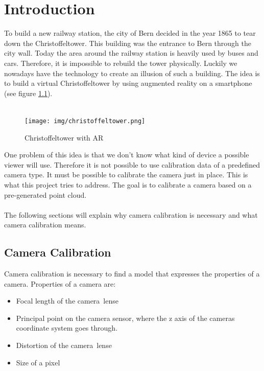 \documentclass[11pt,a4paper,titlepage,oneside]{report}
\begin{document}
\chapter{Introduction}
To build a new railway station, the city of Bern decided in the year 1865 to tear down the Christoffeltower. This building was the entrance to Bern through the city wall. Today the area around the railway station is heavily used by buses and cars. Therefore, it is impossible to rebuild the tower physically. Luckily we nowadays have the technology to create an illusion of such a building. The idea is to build a virtual Christoffeltower by using augmented reality on a smartphone (see figure \ref{fig:christoffeltower}).\\\\
\begin{figure}[H]
  \begin{center}
		\texttt{[image: img/christoffeltower.png]}
  \end{center}
	\caption{Christoffeltower with AR}\label{fig:christoffeltower}
\end{figure}
One problem of this idea is that we don't know what kind of device a possible viewer will use. Therefore it is not possible to use calibration data of a predefined camera type. It must be possible to calibrate the camera just in place. This is what this project tries to address. The goal is to calibrate a camera based on a pre-generated point cloud.\\\\
The following sections will explain why camera calibration is necessary and what camera calibration means.

\section{Camera Calibration}\label{sec:calibration}
Camera calibration is necessary to find a model that expresses the properties of a camera. Properties of a camera are:

\begin{itemize}
	\item Focal length of the camera lense
	\item Principal point on the camera sensor, where the z axis of the cameras coordinate system goes through.
	\item Distortion of the camera lense
	\item Size of a pixel
\end{itemize}
\end{document}
